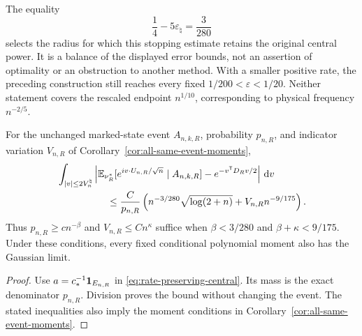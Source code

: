 \begin{remark}
The equality
\[
 \frac14-5\varepsilon_\natural=\frac3{280}
\]
selects the radius for which this stopping estimate retains the original
central power. It is a balance of the displayed error bounds, not an
assertion of optimality or an obstruction to another method. With a
smaller positive rate, the preceding construction still reaches every
fixed $1/200<\varepsilon<1/20$. Neither statement covers the rescaled
endpoint $n^{1/10}$, corresponding to physical frequency $n^{-2/5}$.
\end{remark}

\begin{corollary}
\label{cor:rate-preserving-same-event}
For the unchanged marked-state event $A_{n,k,R}$, probability $p_{n,R}$,
and indicator variation $V_{n,R}$ of
Corollary~\ref{cor:all-same-event-moments},
\begin{align}
 &\int_{|v|\le2V_n^\natural}
 \left|\mathbb E_{\nu_R^*}
       [e^{iv\cdot U_{n,R}/\sqrt n}\mid A_{n,k,R}]
                               -e^{-v^{\mathsf T}D_Rv/2}\right|\dd v\notag\\
 &\hspace{18mm}\le\frac C{p_{n,R}}
        \left(n^{-3/280}\sqrt{\log(2+n)}+V_{n,R}n^{-9/175}\right).
 \label{eq:rate-preserving-same-event}
\end{align}
Thus $p_{n,R}\ge cn^{-\beta}$ and $V_{n,R}\le Cn^\kappa$ suffice
when $\beta<3/280$ and $\beta+\kappa<9/175$. Under these conditions,
every fixed conditional polynomial moment also has the Gaussian limit.
\end{corollary}
\begin{proof}
Use $a=c_*^{-1}\mathbf1_{E_{n,R}}$ in
\eqref{eq:rate-preserving-central}. Its mass is the exact denominator
$p_{n,R}$. Division proves the bound without changing the event.
The stated inequalities also imply the moment conditions in
Corollary~\ref{cor:all-same-event-moments}.
\end{proof}

